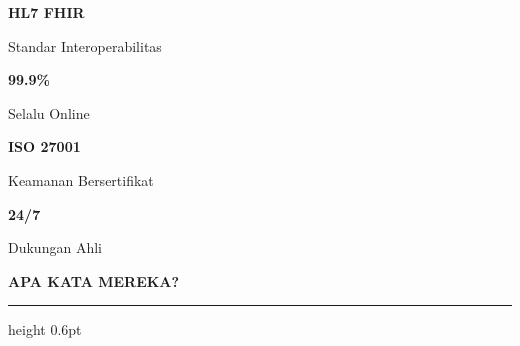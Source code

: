\documentclass[a4paper]{article}
\newcommand{\sectiontitle}[1]{%
    \vspace{10pt}%
    {\fontsize{13}{16}\selectfont\bfseries\color{BlueDark} #1}\par\vspace{3pt}%
    {\color{BluePrimary}\hrule height 0.6pt}\par\vspace{8pt}%
}
\begin{document}
\noindent
\colorbox{BluePrimary}{%
\begin{minipage}{\dimexpr\textwidth-2\fboxsep}
\hspace{6pt}%
\begin{minipage}[t][1.25cm][c]{0.24\linewidth}
    \begin{center}
        {\fontsize{18}{22}\selectfont\bfseries\color{White} HL7 FHIR}\par
        {\fontsize{8}{10}\selectfont\color{BlueMid} Standar Interoperabilitas}
    \end{center}
\end{minipage}%
\hfill
\begin{minipage}[t][1.25cm][c]{0.24\linewidth}
    \begin{center}
        {\fontsize{18}{22}\selectfont\bfseries\color{White} 99.9\%}\par
        {\fontsize{8}{10}\selectfont\color{BlueMid} Selalu Online}
    \end{center}
\end{minipage}%
\hfill
\begin{minipage}[t][1.25cm][c]{0.24\linewidth}
    \begin{center}
        {\fontsize{18}{22}\selectfont\bfseries\color{White} ISO 27001}\par
        {\fontsize{8}{10}\selectfont\color{BlueMid} Keamanan Bersertifikat}
    \end{center}
\end{minipage}%
\hfill
\begin{minipage}[t][1.25cm][c]{0.24\linewidth}
    \begin{center}
        {\fontsize{18}{22}\selectfont\bfseries\color{White} 24/7}\par
        {\fontsize{8}{10}\selectfont\color{BlueMid} Dukungan Ahli}
    \end{center}
\end{minipage}%
\hspace{6pt}%
\end{minipage}}

\sectiontitle{APA KATA MEREKA?}
\end{document}
